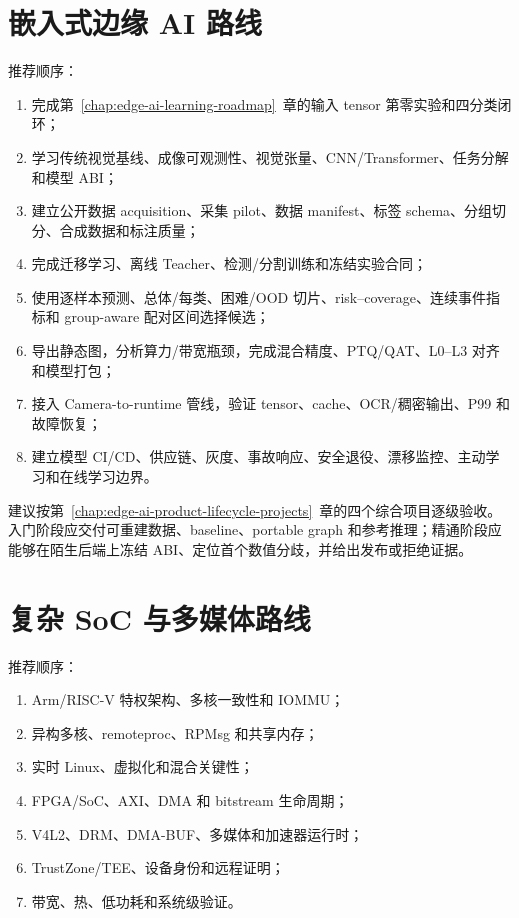 \section{嵌入式边缘 AI 路线}

推荐顺序：
\begin{enumerate}
  \item 完成第~\ref{chap:edge-ai-learning-roadmap}~章的输入 tensor 第零实验和四分类闭环；
  \item 学习传统视觉基线、成像可观测性、视觉张量、CNN/Transformer、任务分解和模型 ABI；
  \item 建立公开数据 acquisition、采集 pilot、数据 manifest、标签 schema、分组切分、合成数据和标注质量；
  \item 完成迁移学习、离线 Teacher、检测/分割训练和冻结实验合同；
  \item 使用逐样本预测、总体/每类、困难/OOD 切片、risk--coverage、连续事件指标和 group-aware 配对区间选择候选；
  \item 导出静态图，分析算力/带宽瓶颈，完成混合精度、PTQ/QAT、L0--L3 对齐和模型打包；
  \item 接入 Camera-to-runtime 管线，验证 tensor、cache、OCR/稠密输出、P99 和故障恢复；
  \item 建立模型 CI/CD、供应链、灰度、事故响应、安全退役、漂移监控、主动学习和在线学习边界。
\end{enumerate}

建议按第~\ref{chap:edge-ai-product-lifecycle-projects}~章的四个综合项目逐级验收。入门阶段应交付可重建数据、baseline、portable graph 和参考推理；精通阶段应能够在陌生后端上冻结 ABI、定位首个数值分歧，并给出发布或拒绝证据。

\section{复杂 SoC 与多媒体路线}

推荐顺序：
\begin{enumerate}
  \item Arm/RISC-V 特权架构、多核一致性和 IOMMU；
  \item 异构多核、remoteproc、RPMsg 和共享内存；
  \item 实时 Linux、虚拟化和混合关键性；
  \item FPGA/SoC、AXI、DMA 和 bitstream 生命周期；
  \item V4L2、DRM、DMA-BUF、多媒体和加速器运行时；
  \item TrustZone/TEE、设备身份和远程证明；
  \item 带宽、热、低功耗和系统级验证。
\end{enumerate}

